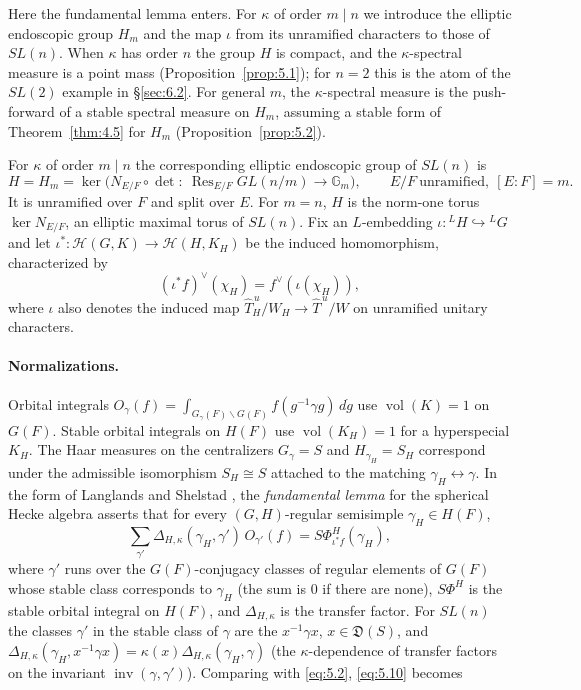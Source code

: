 \documentclass[12pt,letterpaper]{article}
\numberwithin{equation}{section}
\theoremstyle{plain}
\theoremstyle{remark}
\theoremstyle{plain}
\theoremstyle{definition}
\theoremstyle{remark}
\theoremstyle{remark}
\newcommand{\Hc}{\mathcal{H}}
\newcommand{\Thu}{\widehat{T}^{\,u}}
\DeclareMathOperator{\vol}{vol}
\DeclareMathOperator{\Res}{Res}
\DeclareMathOperator{\inv}{inv}
\begin{document}
Here the fundamental lemma enters. For $\kappa$ of order $m\mid n$ we introduce the elliptic endoscopic group $H_m$ and the map $\iota$ from its unramified characters to those of $SL(n)$. When $\kappa$ has order $n$ the group $H$ is compact, and the $\kappa$-spectral measure is a point mass (Proposition~\ref{prop:5.1}); for $n=2$ this is the atom of the $SL(2)$ example in \S\ref{sec:6.2}. For general $m$, the $\kappa$-spectral measure is the push-forward of a stable spectral measure on $H_m$, assuming a stable form of Theorem~\ref{thm:4.5} for $H_m$ (Proposition~\ref{prop:5.2}).


For $\kappa$ of order $m\mid n$ the corresponding elliptic endoscopic group of $SL(n)$ is
\[
H=H_m=\ker\big(N_{E/F}\circ\det:\ \Res_{E/F}GL(n/m)\to\mathbb{G}_m\big),\qquad E/F\ \text{unramified},\ [E:F]=m.
\]
It is unramified over $F$ and split over $E$. For $m=n$, $H$ is the norm-one torus $\ker N_{E/F}$, an elliptic maximal torus of $SL(n)$. Fix an $L$-embedding $\iota:{}^LH\hookrightarrow{}^LG$ and let $\iota^*:\Hc(G,K)\to\Hc(H,K_H)$ be the induced homomorphism, characterized by
\[
(\iota^*f)^\vee(\chi_H)=f^\vee(\iota(\chi_H)),
\]
where $\iota$ also denotes the induced map $\Thu_H/W_H\to\Thu/W$ on unramified unitary characters. \paragraph{Normalizations.} Orbital integrals $O_\gamma(f)=\int_{G_\gamma(F)\backslash G(F)}f(g^{-1}\gamma g)\,d\dot g$ use $\vol(K)=1$ on $G(F)$. Stable orbital integrals on $H(F)$ use $\vol(K_H)=1$ for a hyperspecial $K_H$. The Haar measures on the centralizers $G_\gamma=S$ and $H_{\gamma_H}=S_H$ correspond under the admissible isomorphism $S_H\cong S$ attached to the matching $\gamma_H\leftrightarrow\gamma$. In the form of Langlands and Shelstad \cite[(1.4)]{LS87}, the \emph{fundamental lemma} for the spherical Hecke algebra asserts that for every $(G,H)$-regular semisimple $\gamma_H\in H(F)$,
\begin{equation}\label{eq:5.10}
\sum_{\gamma'}\Delta_{H,\kappa}(\gamma_H,\gamma')\,O_{\gamma'}(f)=S\Phi^H_{\iota^*f}(\gamma_H),
\end{equation}
where $\gamma'$ runs over the $G(F)$-conjugacy classes of regular elements of $G(F)$ whose stable class corresponds to $\gamma_H$ (the sum is $0$ if there are none), $S\Phi^H$ is the stable orbital integral on $H(F)$, and $\Delta_{H,\kappa}$ is the transfer factor. For $SL(n)$ the classes $\gamma'$ in the stable class of $\gamma$ are the $x^{-1}\gamma x$, $x\in\mathfrak D(S)$, and $\Delta_{H,\kappa}(\gamma_H,x^{-1}\gamma x)=\kappa(x)\Delta_{H,\kappa}(\gamma_H,\gamma)$ (the $\kappa$-dependence of transfer factors on the invariant $\inv(\gamma,\gamma')$). Comparing with \eqref{eq:5.2}, \eqref{eq:5.10} becomes
\end{document}
